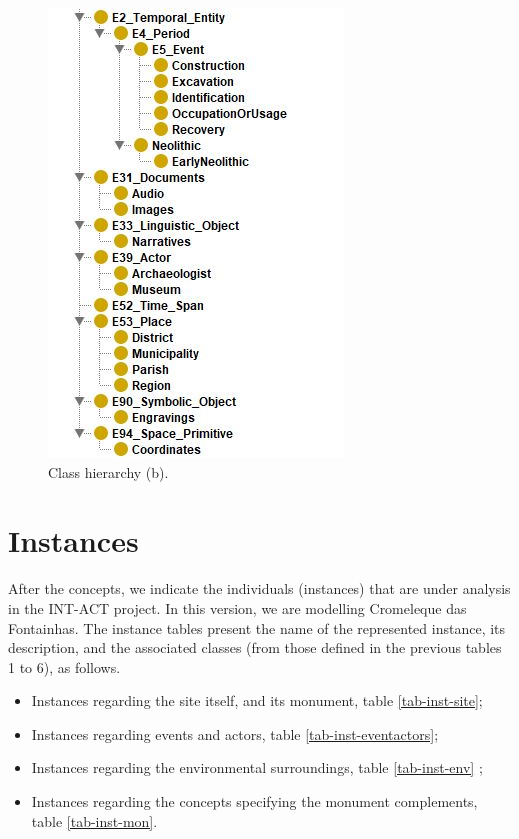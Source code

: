 \documentclass[10pt]{report}
\begin{document}
\begin{figure}[!ht]
\begin{minipage}{0.5\textwidth}
\end{minipage}\hfill
\begin{minipage}{0.5\textwidth}
    \centering
    \includegraphics[height=0.5\textheight]{figures/Onto_Alinhada2.JPG}
    \caption{\label{fig:cat1b}Class hierarchy (b).}
    
\end{minipage}
\end{figure}





\section{Instances}\label{sec-instances}

After the concepts, we indicate the individuals (instances) that are under analysis in the INT-ACT project. In this version, we are modelling Cromeleque das Fontainhas. The instance tables present the  name of the represented instance, its description, and the associated classes (from those defined in the previous tables 1 to 6), as follows. 

\begin{itemize}
    \item Instances regarding  the site itself, and its monument, table \ref{tab-inst-site};
   
    \item Instances regarding events and actors, table \ref{tab-inst-eventactors};
    
    \item Instances regarding the environmental surroundings, table \ref{tab-inst-env} ;  

 \item Instances regarding the concepts specifying the monument complements, table \ref{tab-inst-mon}.
 
\end{itemize}
\end{document}
